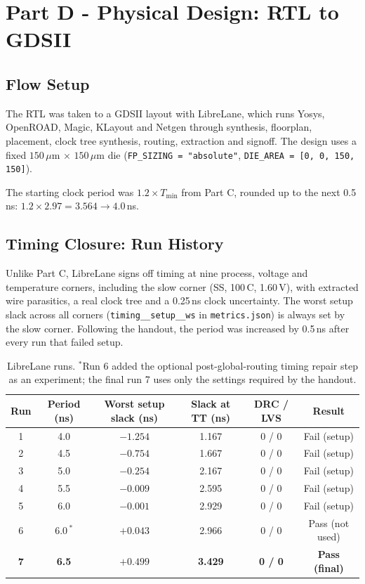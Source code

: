 \documentclass[11pt,a4paper]{article}
\begin{document}
\section{Part D - Physical Design: RTL to GDSII}

\subsection{Flow Setup}

The RTL was taken to a GDSII layout with LibreLane, which runs Yosys,
OpenROAD, Magic, KLayout and Netgen through synthesis, floorplan, placement,
clock tree synthesis, routing, extraction and signoff. The design uses a fixed
$150\,\mu$m $\times$ $150\,\mu$m die (\texttt{FP\_SIZING = "absolute"},
\texttt{DIE\_AREA = [0, 0, 150, 150]}).

The starting clock period was $1.2 \times T_{\min}$ from Part C, rounded up
to the next 0.5\,ns: $1.2 \times 2.97 = 3.564 \rightarrow 4.0$\,ns.

\subsection{Timing Closure: Run History}

Unlike Part C, LibreLane signs off timing at nine process, voltage and
temperature corners, including the slow corner (SS, 100\,\textdegree C,
1.60\,V), with extracted wire parasitics, a real clock tree and a
0.25\,ns clock uncertainty. The worst setup slack across all corners
(\texttt{timing\_\_setup\_\_ws} in \texttt{metrics.json}) is always set by the
slow corner. Following the handout, the period was increased by 0.5\,ns after
every run that failed setup.

\begin{table}[H]
  \centering
  \begin{tabular}{cccccc}
    \toprule
    \textbf{Run} & \textbf{Period (ns)} & \textbf{Worst setup slack (ns)} &
    \textbf{Slack at TT (ns)} & \textbf{DRC / LVS} & \textbf{Result} \\
    \midrule
    1 & 4.0 & $-1.254$ & 1.167 & 0 / 0 & Fail (setup) \\
    2 & 4.5 & $-0.754$ & 1.667 & 0 / 0 & Fail (setup) \\
    3 & 5.0 & $-0.254$ & 2.167 & 0 / 0 & Fail (setup) \\
    4 & 5.5 & $-0.009$ & 2.595 & 0 / 0 & Fail (setup) \\
    5 & 6.0 & $-0.001$ & 2.929 & 0 / 0 & Fail (setup) \\
    6 & 6.0\,$^{*}$ & $+0.043$ & 2.966 & 0 / 0 & Pass (not used) \\
    \textbf{7} & \textbf{6.5} & $\mathbf{+0.499}$ & \textbf{3.429} & \textbf{0 / 0} & \textbf{Pass (final)} \\
    \bottomrule
  \end{tabular}
  \caption{LibreLane runs. $^{*}$Run 6 added the optional post-global-routing
  timing repair step as an experiment; the final run 7 uses only the settings
  required by the handout.}
  \label{tab:partD_runs}
\end{table}
\end{document}
